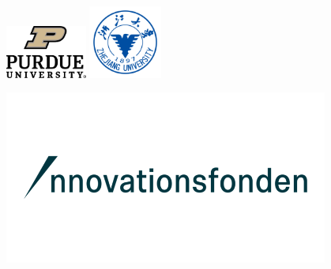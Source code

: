 \begin{center}
\vspace{2ex}

\includegraphics[width=0.2\textwidth, valign=c]{Phd_thesis/figs/logos/purdue.png}
\hspace{14ex}
\includegraphics[width=0.18\textwidth, valign=c]{Phd_thesis/figs/logos/zju.png}



\vspace{1ex}



\vspace{1ex}

\includegraphics[width=0.8\textwidth]{Phd_thesis/figs/logos/inno.png}
\end{center}

\cleardoublepage


